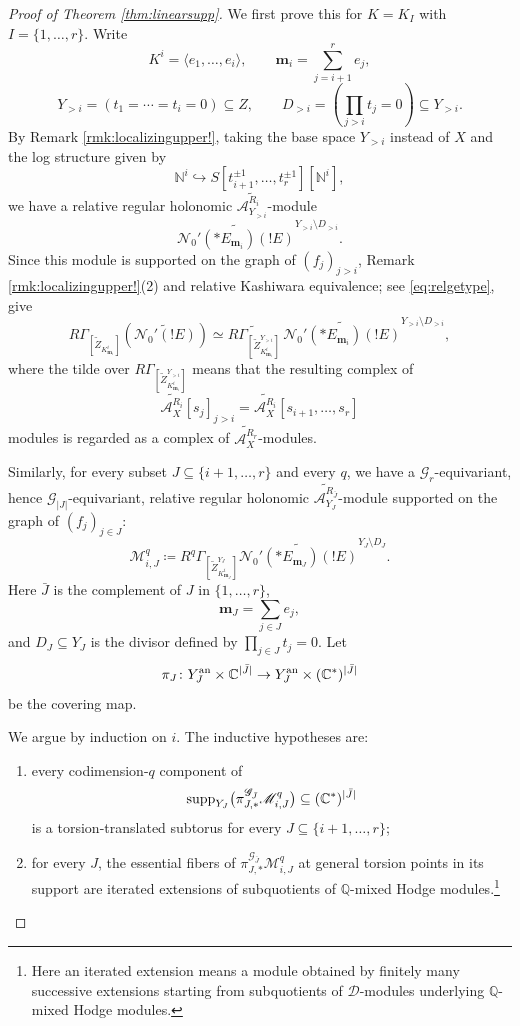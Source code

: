 \documentclass{amsart}
\theoremstyle{plain}
\numberwithin{theorem}{section}
\theoremstyle{definition}
\theoremstyle{remark}
\theoremstyle{definition}
\newcommand{\wt}{\widetilde}
\newcommand{\C}{\mathbb{C}} %
\newcommand{\N}{\mathbb{N}}
\newcommand{\Q}{\mathbb{Q}}
\newcommand{\cN}{\mathcal{N}}
\newcommand{\bm}{\mathbf{m}}
\newcommand{\sM}{\mathscr{M}}
\newcommand{\sA}{\mathscr{A}}
\newcommand{\sG}{\mathscr{G}}
\newcommand{\shD}{\mathscr{D}}
\newcommand{\an}{\textup{an}}
\newcommand{\supp}{\textup{supp}}
\begin{document}
\begin{proof}[Proof of Theorem \ref{thm:linearsupp}]
We first prove this for $K=K_I$ with $I=\{1,\dots,r\}$. Write
\[
K^i=\langle e_1,\dots,e_i\rangle,
\qquad
\bm_i=\sum_{j=i+1}^r e_j,
\]
\[
Y_{>i}=(t_1=\cdots=t_i=0)\subseteq Z,
\qquad
D_{>i}=\left(\prod_{j>i}t_j=0\right)\subseteq Y_{>i}.
\]
By Remark \ref{rmk:localizingupper!}, taking the base space $Y_{>i}$ instead
of $X$ and the log structure given by
\[
\N^i\hookrightarrow
S[t_{i+1}^{\pm1},\dots,t_r^{\pm1}][\N^i],
\]
we have a relative regular holonomic
$\wt{\sA_{Y_{>i}}^{R_i}}$-module
\[
\wt{\cN_0'(*E_{\bm_i})(!E)}^{Y_{>i}\setminus D_{>i}}.
\]
Since this module is supported on the graph of $(f_j)_{j>i}$, Remark
\ref{rmk:localizingupper!}(2) and relative Kashiwara equivalence; see
\eqref{eq:relgetype}, give
\[
R\Gamma_{[\wt Z_{K^i_{\bm_i}}]}(\wt{\cN_0'(!E)})
\simeq
\widetilde{
R\Gamma_{[\wt Z_{K^i_{\bm_i}}^{Y_{>i}}]}
}
\,
\wt{\cN_0'(*E_{\bm_i})(!E)}^{Y_{>i}\setminus D_{>i}},
\]
where the tilde over
$R\Gamma_{[\wt Z_{K^i_{\bm_i}}^{Y_{>i}}]}$
means that the resulting complex of
\[
\wt{\sA_X^{R_i}}[s_j]_{j>i}
=
\wt{\sA_X^{R_i}}[s_{i+1},\dots,s_r]
\]
modules is regarded as a complex of $\wt{\sA_X^{R_r}}$-modules.

Similarly, for every subset $J\subseteq\{i+1,\dots,r\}$ and every $q$, we
have a $\sG_r$-equivariant, hence $\sG_{|J|}$-equivariant, relative regular
holonomic $\wt{\sA_{Y_J}^{R_{\bar J}}}$-module supported on the graph of
$(f_j)_{j\in J}$:
\[
\sM^q_{i,J}
\coloneqq
R^q\Gamma_{[\wt Z_{K^i_{\bm_J}}^{Y_J}]}
\wt{\cN_0'(*E_{\bm_J})(!E)}^{Y_J\setminus D_J}.
\]
Here $\bar J$ is the complement of $J$ in $\{1,\dots,r\}$,
\[
\bm_J=\sum_{j\in J}e_j,
\]
and $D_J\subseteq Y_J$ is the divisor defined by
$\prod_{j\in J}t_j=0.$
Let
\[
\pi_J\colon
Y_J^\an\times \C^{|\bar J|}
\to
Y_J^\an\times(\C^*)^{|\bar J|}
\]
be the covering map.

We argue by induction on $i$. The inductive hypotheses are:
\begin{enumerate}[label=(H\arabic*)]
    \item every codimension-$q$ component of
    \[
    \supp_{Y_J}
    \big(
    \pi_{J,*}^{\sG_{\bar J}}\sM^q_{i,J}
    \big)
    \subseteq
    (\C^*)^{|\bar J|}
    \]
    is a torsion-translated subtorus for every
    $J\subseteq\{i+1,\dots,r\}$;

    \item for every $J$, the essential fibers of
    $\pi_{J,*}^{\sG_{\bar J}}\sM^q_{i,J}$
    at general torsion points in its support are iterated extensions of
    subquotients of $\Q$-mixed Hodge modules.\footnote{Here an iterated
    extension means a module obtained by finitely many successive extensions
    starting from subquotients of $\shD$-modules underlying $\Q$-mixed Hodge
    modules.}
\end{enumerate}


\end{proof}
\end{document}
